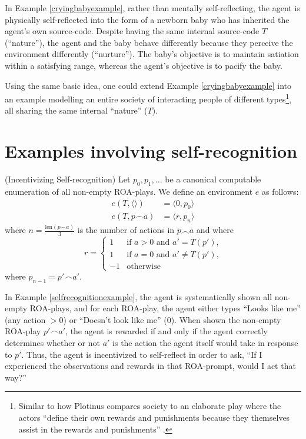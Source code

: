\documentclass[runningheads]{llncs}
\begin{document}
In Example \ref{cryingbabyexample}, rather than mentally self-reflecting,
the agent is physically self-reflected into the form of a newborn baby
who has inherited the agent's own source-code. Despite having the same
internal source-code $T$ (``nature''), the agent and the baby behave
differently because they perceive the environment differently (``nurture'').
The baby's objective is to maintain satiation within a satisfying range,
whereas the agent's objective is to pacify the baby.

Using the same basic idea, one could extend Example \ref{cryingbabyexample}
into an example modelling an entire society of interacting people of different
types\footnote{Similar to how Plotinus compares society to an elaborate play
where the actors ``define their own rewards and punishments because
they themselves assist in the rewards and punishments'' \cite{plotinus}.},
all sharing the same internal ``nature'' ($T$).

\section{Examples involving self-recognition}

\begin{example}
\label{selfrecognitionexample}
    (Incentivizing Self-recognition)
    Let $p_0,p_1,\ldots$ be a canonical computable enumeration of all non-empty ROA-plays.
    We define an environment $e$ as follows:
    \begin{align*}
        e(T,\langle\rangle) &= \langle 0, p_0\rangle\\
        e(T,p\frown a) &= \langle r, p_{n}\rangle
    \end{align*}
    where $n=\frac{\mbox{len}(p\frown a)}{3}$ is the number of actions in $p\frown a$ and where
    \[
        r =
        \begin{cases}
            1 &\mbox{if $a>0$ and $a'=T(p')$,}\\
            1 &\mbox{if $a=0$ and $a'\not=T(p')$,}\\
            -1 &\mbox{otherwise}
        \end{cases}
    \]
    where $p_{n-1}=p'\frown a'$.
\end{example}

In Example \ref{selfrecognitionexample}, the agent is systematically
shown all non-empty ROA-plays, and for
each ROA-play, the agent either types ``Looks like me'' (any action $>0$)
or ``Doesn't look like me'' ($0$). When shown the non-empty ROA-play
$p'\frown a'$, the agent is rewarded if and only if the agent
correctly determines whether or not $a'$
is the action the agent itself would take in response to $p'$.
Thus, the agent is incentivized to self-reflect in order to ask, ``If I experienced the
observations and rewards in that ROA-prompt, would I act that way?''
\end{document}
